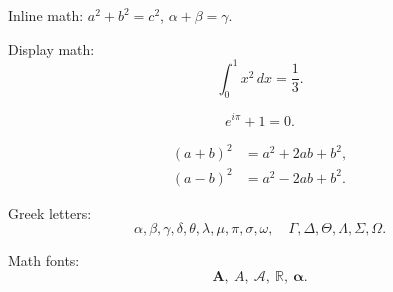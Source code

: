 \documentclass[a4paper,12pt]{article}
\begin{document}
Inline math: $a^2+b^2=c^2$, $\alpha+\beta=\gamma$.

Display math:
\[
  \int_0^1 x^2\,dx=\frac{1}{3}.
\]

\begin{equation}
  e^{i\pi}+1=0.
\end{equation}

\begin{align}
  (a+b)^2 &= a^2+2ab+b^2,\\
  (a-b)^2 &= a^2-2ab+b^2.
\end{align}

Greek letters:
\[
\alpha,\beta,\gamma,\delta,\theta,\lambda,\mu,\pi,\sigma,\omega,
\quad
\Gamma,\Delta,\Theta,\Lambda,\Sigma,\Omega.
\]

Math fonts:
\[
\mathbf{A},\ \mathit{A},\ \mathcal{A},\ \mathbb{R},\ \bm{\alpha}.
\]
\end{document}
